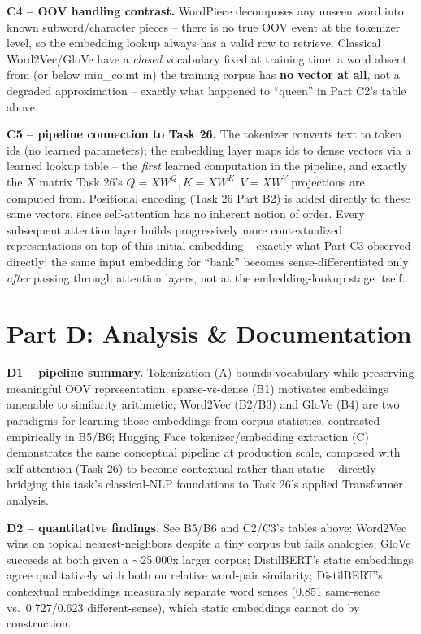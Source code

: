 \documentclass[11pt,a4paper]{article}
\begin{document}
\textbf{C4 -- OOV handling contrast.} WordPiece decomposes any unseen word into known
subword/character pieces -- there is no true OOV event at the tokenizer level, so the
embedding lookup always has a valid row to retrieve. Classical Word2Vec/GloVe have a
\emph{closed} vocabulary fixed at training time: a word absent from (or below min\_count in)
the training corpus has \textbf{no vector at all}, not a degraded approximation -- exactly
what happened to ``queen'' in Part C2's table above.

\textbf{C5 -- pipeline connection to Task 26.} The tokenizer converts text to token ids (no
learned parameters); the embedding layer maps ids to dense vectors via a learned lookup table
-- the \emph{first} learned computation in the pipeline, and exactly the $X$ matrix Task 26's
$Q{=}XW^Q, K{=}XW^K, V{=}XW^V$ projections are computed from. Positional encoding (Task 26
Part B2) is added directly to these same vectors, since self-attention has no inherent notion
of order. Every subsequent attention layer builds progressively more contextualized
representations on top of this initial embedding -- exactly what Part C3 observed directly:
the same input embedding for ``bank'' becomes sense-differentiated only \emph{after} passing
through attention layers, not at the embedding-lookup stage itself.

\section*{Part D: Analysis \& Documentation}

\textbf{D1 -- pipeline summary.} Tokenization (A) bounds vocabulary while preserving
meaningful OOV representation; sparse-vs-dense (B1) motivates embeddings amenable to
similarity arithmetic; Word2Vec (B2/B3) and GloVe (B4) are two paradigms for learning those
embeddings from corpus statistics, contrasted empirically in B5/B6; Hugging Face
tokenizer/embedding extraction (C) demonstrates the same conceptual pipeline at production
scale, composed with self-attention (Task 26) to become contextual rather than static --
directly bridging this task's classical-NLP foundations to Task 26's applied Transformer
analysis.

\textbf{D2 -- quantitative findings.} See B5/B6 and C2/C3's tables above: Word2Vec wins on
topical nearest-neighbors despite a tiny corpus but fails analogies; GloVe succeeds at both
given a $\sim$25,000x larger corpus; DistilBERT's static embeddings agree qualitatively with
both on relative word-pair similarity; DistilBERT's contextual embeddings measurably
separate word senses (0.851 same-sense vs.\ 0.727/0.623 different-sense), which static
embeddings cannot do by construction.
\end{document}
